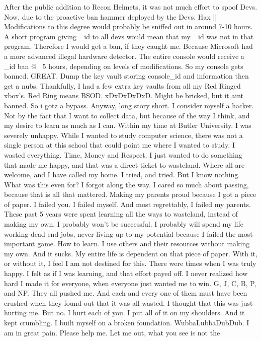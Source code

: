 After the public addition to Recon Helmets, it was not much effort to spoof Devs.
Now, due to the proactive ban hammer deployed by the Devs. Hax || Modifications to this degree
would probably be sniffed out in around 7-10 hours. A short program giving _id to all devs
would mean that my _id was not in that program. Therefore I would get a ban, if they caught me.
Because Microsoft had a more advanced illegal hardware detector. The entire console would receive
a _id ban @ ~5 hours, depending on levels of modifications. 
So my console gets banned. GREAT. Dump the key vault storing console_id and information
then get a nubs. Thankfully, I had a few extra key vaults from all my Red Ringed xbox's.
Red Ring means BSOD. xDxDxDxDxD. Might be bricked, but it aint banned. So i gotz a bypass.
Anyway, long story short. I consider myself a hacker. Not by the fact that I want to collect data,
but because of the way I think, and my desire to learn as much as I can. 
Within my time at Butler University. I was severely unhappy. While I wanted to study computer science,
there was not a single person at this school that could point me where I wanted to study.
I wasted everything. Time, Money and Respect. I just wanted to do something that made me happy,
and that was a direct ticket to wasteland. Where all are welcome, and I have called my home. 
I tried, and tried. But I know nothing. What was this even for? I forgot along the way. 
I cared so much about passing, because that is all that mattered. Making my parents proud because
I got a piece of paper. I failed you. I failed myself. And most regrettably, I failed my parents.
These past 5 years were spent learning all the ways to wasteland, instead of making my own.
I probably won't be successful. I probably will spend my life working dead end jobs, never
living up to my potential because I failed the most important game. How to learn.
I use others and their resources without making my own. And it sucks. My entire life
is dependent on that piece of paper. With it, or without it, I feel I am not destined for this.
There were times when I was truly happy. I felt as if I was learning, and that effort payed off.
I never realized how hard I made it for everyone, when everyone just wanted me to win.
G, J, C, B, P, and NP. They all pushed me. And each and every one of them must have been crushed when they
found out that it was all wasted. I thought that this was just hurting me. But no. I hurt each of you.
I put all of it on my shoulders. And it kept crumbling. I built myself on a broken foundation.
WubbaLubbaDubDub. I am in great pain. Please help me. Let me out, what you see is not the 
